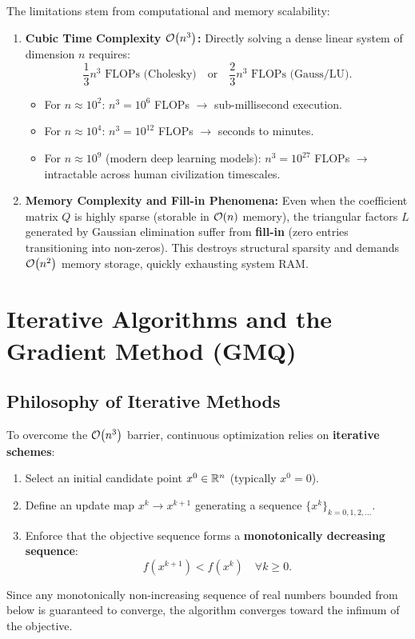 The limitations stem from computational and memory scalability:
\begin{enumerate}
    \item \textbf{Cubic Time Complexity $\mathcal{O}\!\left(n^3\right)$:}
    Directly solving a dense linear system of dimension $n$ requires:
    \begin{equation}
        \frac{1}{3} n^3 \text{ FLOPs (Cholesky)} \quad \text{or} \quad \frac{2}{3} n^3 \text{ FLOPs (Gauss/LU)}.
    \end{equation}
    \begin{itemize}
        \item For $n \approx 10^2$: $n^3 = 10^6$ FLOPs $\longrightarrow$ sub-millisecond execution.
        \item For $n \approx 10^4$: $n^3 = 10^{12}$ FLOPs $\longrightarrow$ seconds to minutes.
        \item For $n \approx 10^9$ (modern deep learning models): $n^3 = 10^{27}$ FLOPs $\longrightarrow$ intractable across human civilization timescales.
    \end{itemize}

    \item \textbf{Memory Complexity and Fill-in Phenomena:}
    Even when the coefficient matrix $Q$ is highly sparse (storable in $\mathcal{O}\!\left(n\right)$ memory), the triangular factors $L$ generated by Gaussian elimination suffer from \textbf{fill-in} (zero entries transitioning into non-zeros). This destroys structural sparsity and demands $\mathcal{O}\!\left(n^2\right)$ memory storage, quickly exhausting system RAM.
\end{enumerate}


\FloatBarrier
\section{Iterative Algorithms and the Gradient Method (GMQ)}
\label{sec:iterative-algorithms-gmq}

\subsection{Philosophy of Iterative Methods}
To overcome the $\mathcal{O}\!\left(n^3\right)$ barrier, continuous optimization relies on \textbf{iterative schemes}:
\begin{enumerate}
    \item Select an initial candidate point $x^0 \in \mathbb{R}^n$ (typically $x^0 = 0$).
    \item Define an update map $x^k \to x^{k+1}$ generating a sequence $\{x^k\}_{k=0, 1, 2, \dots}$.
    \item Enforce that the objective sequence forms a \textbf{monotonically decreasing sequence}:
    \begin{equation}
        f(x^{k+1}) < f(x^k) \quad \forall k \ge 0.
    \end{equation}
\end{enumerate}
Since any monotonically non-increasing sequence of real numbers bounded from below is guaranteed to converge, the algorithm converges toward the infimum of the objective.

